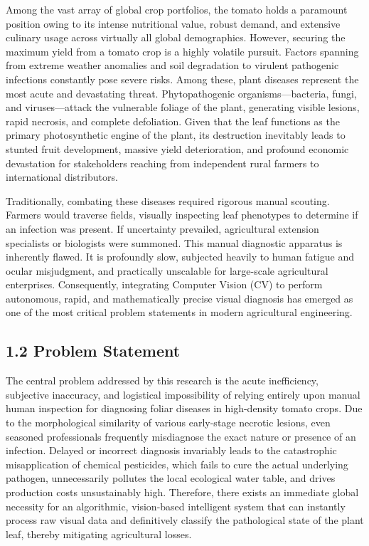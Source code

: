 \documentclass[
]{article}
\begin{document}
Among the vast array of global crop portfolios, the tomato holds a
paramount position owing to its intense nutritional value, robust
demand, and extensive culinary usage across virtually all global
demographics. However, securing the maximum yield from a tomato crop is
a highly volatile pursuit. Factors spanning from extreme weather
anomalies and soil degradation to virulent pathogenic infections
constantly pose severe risks. Among these, plant diseases represent the
most acute and devastating threat. Phytopathogenic organisms---bacteria,
fungi, and viruses---attack the vulnerable foliage of the plant,
generating visible lesions, rapid necrosis, and complete defoliation.
Given that the leaf functions as the primary photosynthetic engine of
the plant, its destruction inevitably leads to stunted fruit
development, massive yield deterioration, and profound economic
devastation for stakeholders reaching from independent rural farmers to
international distributors.

Traditionally, combating these diseases required rigorous manual
scouting. Farmers would traverse fields, visually inspecting leaf
phenotypes to determine if an infection was present. If uncertainty
prevailed, agricultural extension specialists or biologists were
summoned. This manual diagnostic apparatus is inherently flawed. It is
profoundly slow, subjected heavily to human fatigue and ocular
misjudgment, and practically unscalable for large-scale agricultural
enterprises. Consequently, integrating Computer Vision (CV) to perform
autonomous, rapid, and mathematically precise visual diagnosis has
emerged as one of the most critical problem statements in modern
agricultural engineering.

\subsection{1.2 Problem Statement}\label{problem-statement}

The central problem addressed by this research is the acute
inefficiency, subjective inaccuracy, and logistical impossibility of
relying entirely upon manual human inspection for diagnosing foliar
diseases in high-density tomato crops. Due to the morphological
similarity of various early-stage necrotic lesions, even seasoned
professionals frequently misdiagnose the exact nature or presence of an
infection. Delayed or incorrect diagnosis invariably leads to the
catastrophic misapplication of chemical pesticides, which fails to cure
the actual underlying pathogen, unnecessarily pollutes the local
ecological water table, and drives production costs unsustainably high.
Therefore, there exists an immediate global necessity for an
algorithmic, vision-based intelligent system that can instantly process
raw visual data and definitively classify the pathological state of the
plant leaf, thereby mitigating agricultural losses.
\end{document}
